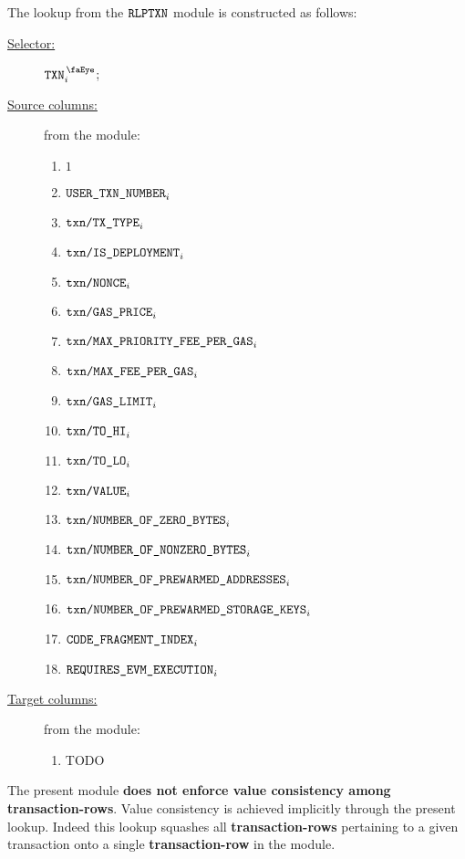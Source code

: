 The lookup from the $\texttt{RLPTXN}$ module is constructed as follows:
\begin{description}
	\item[\underline{Selector:}] $\isTxn _{i}$;
	\item[\underline{Source columns:}] from the \rlpTxnMod{} module:
		\begin{multicols}{3}
			\begin{enumerate}
				\item $1$
				\item $\texttt{USER}\texttt{\_}\texttt{TXN\_NUMBER}                       _{i}$
				\item $\texttt{txn}\texttt{/}\texttt{{TX\_TYPE}}               _{i}$
				\item $\texttt{txn}\texttt{/}\texttt{{IS\_DEPLOYMENT}}                _{i}$
				\item $\texttt{txn}\texttt{/}\texttt{{\texttt{NONCE}}}                _{i}$
				\item $\texttt{txn}\texttt{/}\texttt{{GAS\_PRICE}}             _{i}$
				\item $\texttt{txn}\texttt{/}\texttt{{MAX\_PRIORITY\_FEE\_PER\_GAS}} _{i}$
				\item $\texttt{txn}\texttt{/}\texttt{{MAX\_FEE\_PER\_GAS}}         _{i}$
				\item $\texttt{txn}\texttt{/}\texttt{{GAS\_LIMIT}}             _{i}$
				\item $\texttt{txn}\texttt{/}\texttt{{TO\_HI}}                 _{i}$
				\item $\texttt{txn}\texttt{/}\texttt{{TO\_LO}}                 _{i}$
				\item $\texttt{txn}\texttt{/}\texttt{{VALUE}}             _{i}$
				\item $\texttt{txn}\texttt{/}\texttt{{NUMBER\_OF\_ZERO\_BYTES}}         _{i}$
				\item $\texttt{txn}\texttt{/}\texttt{{NUMBER\_OF\_NONZERO\_BYTES}}      _{i}$
				\item $\texttt{txn}\texttt{/}\texttt{{NUMBER\_OF\_PREWARMED\_ADDRESSES}}      _{i}$
				\item $\texttt{txn}\texttt{/}\texttt{{NUMBER\_OF\_PREWARMED\_STORAGE\_KEYS}}   _{i}$
				\item $\texttt{CODE\_FRAGMENT\_INDEX}                                         _{i}$
				\item $\texttt{REQUIRES\_EVM\_EXECUTION}      _{i}$
			\end{enumerate}
		\end{multicols}
	\item[\underline{Target columns:}] from the \userTxnDataMod{} module: 
		\begin{multicols}{3}
			\begin{enumerate}
				\item TODO
			\end{enumerate} 
		\end{multicols}
\end{description}
\saNote{}
The present module \textbf{does not enforce value consistency among transaction-rows}.
Value consistency is achieved implicitly through the present lookup.
Indeed this lookup squashes all \textbf{transaction-rows} pertaining to a given transaction
onto a single \textbf{transaction-row} in the \rlpTxnMod{} module.

